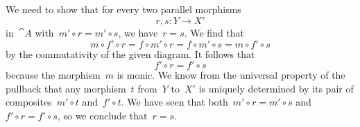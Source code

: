 \subsection{}

We need to show that for every two parallel morphisms
\[
	r, s \colon Y \to X'
\]
in~$\cat{A}$ with~$m' ∘ r = m' ∘ s$, we have~$r = s$.
We find that
\[
	m ∘ f' ∘ r
	=
	f ∘ m' ∘ r
	=
	f ∘ m' ∘ s
	=
	m ∘ f' ∘ s
\]
by the commutativity of the given diagram.
It follows that
\[
	f' ∘ r = f' ∘ s
\]
because the morphism~$m$ is monic.
We know from the universal property of the pullback that any morphism~$t$ from~$Y$ to~$X'$ is uniquely determined by its pair of composites~$m' ∘ t$ and~$f' ∘ t$.
We have seen that both~$m' ∘ r = m' ∘ s$ and~$f' ∘ r = f' ∘ s$, so we conclude that~$r = s$.
